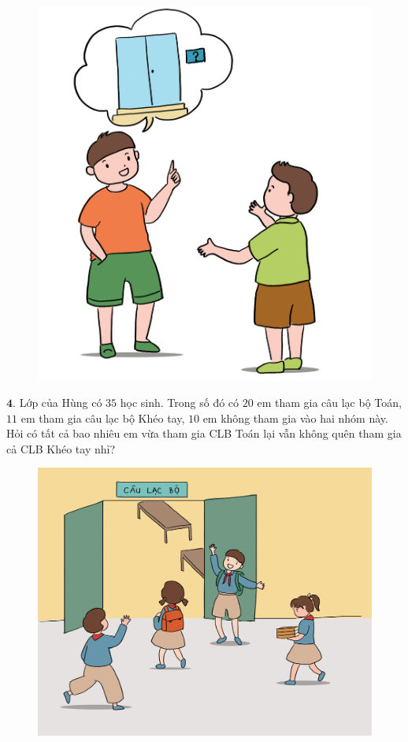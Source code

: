 \begin{multicols}{2}
\begin{figure}[H]
		\centering
		\vspace*{-5pt}
		\captionsetup{labelformat= empty, justification=centering}
		\includegraphics[width=1\linewidth]{Pi10_ToanBi_Bai3}
		\vspace*{-15pt}
	\end{figure}
	$\pmb{4.}$ Lớp của Hùng có $35$ học sinh. Trong số đó có $20$ em tham gia câu lạc bộ Toán, $11$ em tham gia câu lạc bộ Khéo tay, $10$ em không tham gia vào hai nhóm này. Hỏi có tất cả bao nhiêu em vừa tham gia CLB Toán lại vẫn không quên tham gia cả CLB Khéo tay nhỉ?
	\begin{figure}[H]
		\centering
		\vspace*{-5pt}
		\captionsetup{labelformat= empty, justification=centering}
		\includegraphics[width=1\linewidth]{Pi10_ToanBi_Bai4}

\end{figure}
\end{multicols}
